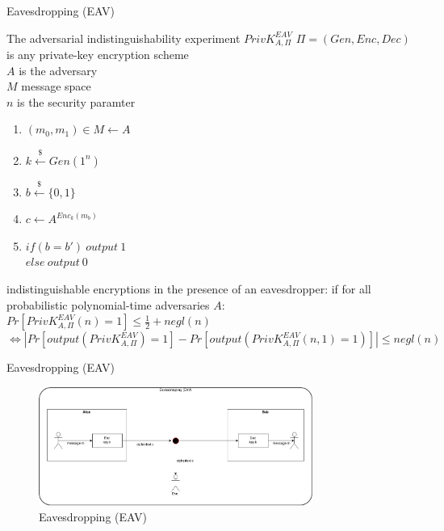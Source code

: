\documentclass[ucs,9pt]{beamer}
\begin{document}
\begin{frame}{Eavesdropping (EAV)}
    \begin{block}{The adversarial indistinguishability experiment $PrivK_{A,\Pi}^{EAV}$}
        $\Pi = (Gen, Enc, Dec)$ is any private-key encryption scheme\\
        $A$ is the adversary\\
        $M$ message space\\
        $n$ is the security paramter\\
        
        \begin{enumerate}
            \item $(m_0,m_1) \in M \leftarrow A$
            \item $k \overset{\$}{\leftarrow} Gen(1^n)$
            \item $b \overset{\$}{\leftarrow} \{0,1\}$
            \item $c \leftarrow A^{Enc_{k}(m_b)}$
                \item $if(b = b')\ output\ 1$ \\
                $else\ output\ 0$
        \end{enumerate}
        
        indistinguishable encryptions in the presence of an eavesdropper: if for all probabilistic polynomial-time adversaries $A$:\\
        $Pr[PrivK_{A,\Pi}^{EAV}(n) = 1] \leq \frac{1}{2} + negl(n)$
        $\Leftrightarrow \left | Pr[output(PrivK_{A,\Pi}^{EAV}) = 1] - Pr[output(PrivK_{A,\Pi}^{EAV}(n,1) = 1)] \right | \leq negl(n)$
    \end{block}
\end{frame}

\begin{frame}{Eavesdropping (EAV)}
    
    \begin{figure}[h]
        \centering
        \includegraphics[width=0.8\textwidth]{figures/EAV.png}
        \caption{Eavesdropping (EAV)}
    \end{figure}
\end{frame}
\end{document}
